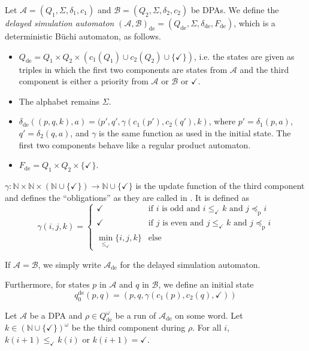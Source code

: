 \begin{defn}
	Let $\mathcal{A} = (Q_1, \Sigma, \delta_1, c_1)$ and $\mathcal{B} = (Q_2, \Sigma, \delta_2, c_2)$ be DPAs. We define the \emph{delayed simulation automaton} $(\mathcal{A},\mathcal{B})_\text{de} = (Q_\text{de}, \Sigma, \delta_\text{de}, F_\text{de})$, which is a deterministic Büchi automaton, as follows.
	
	\begin{itemize}
		\item $Q_\text{de} = Q_1 \times Q_2 \times (c_1(Q_1) \cup c_2(Q_2) \cup \{ \checkmark \})$, i.e. the states are given as triples in which the first two components are states from $\mathcal{A}$ and the third component is either a priority from $\mathcal{A}$ or $\mathcal{B}$ or $\checkmark$.
		\item The alphabet remains $\Sigma$.
		\item $\delta_\text{de}( (p, q, k), a ) = ( p', q', \gamma(c_1(p'), c_2(q'), k)$, where $p' = \delta_1(p, a)$, $q' = \delta_2(q, a)$, and $\gamma$ is the same function as used in the initial state. The first two components behave like a regular product automaton.
		\item $F_\text{de} = Q_1 \times Q_2 \times \{ \checkmark \}$.
	\end{itemize}
	
	$\gamma : \mathbb{N} \times \mathbb{N} \times (\mathbb{N} \cup \{\checkmark\}) \rightarrow \mathbb{N} \cup \{\checkmark\}$ is the update function of the third component and defines the \enquote{obligations} as they are called in \cite{FritzWilke06}. It is defined as 
	$$ \gamma(i, j, k) = \begin{cases}
		\checkmark & \text{if } i \text{ is odd and } i \leq_\checkmark k \text{ and } j \preceq_\text{p} i \\
		\checkmark & \text{if } j \text{ is even and } j \leq_\checkmark k \text{ and } j \preceq_\text{p} i \\
		\min_{\leq_\checkmark} \{ i,j,k \} & \text{else}
	\end{cases} $$
	
	If $\mathcal{A} = \mathcal{B}$, we simply write $\mathcal{A}_\text{de}$ for the delayed simulation automaton.
	
	Furthermore, for states $p$ in $\mathcal{A}$ and $q$ in $\mathcal{B}$, we define an initial state $$q_0^\text{de}(p, q) = (p, q, \gamma(c_1(p), c_2(q), \checkmark))$$
\end{defn}

\begin{lem}
\label{lem:fritzwilke:k_shrink}
	Let $\mathcal{A}$ be a DPA and $\rho \in Q_\text{de}^\omega$ be a run of $\mathcal{A}_\text{de}$ on some word. Let $k \in (\mathbb{N} \cup \{\checkmark\})^\omega$ be the third component during $\rho$. For all $i$, $k(i+1) \leq_\checkmark k(i)$ or $k(i+1) = \checkmark$.
\end{lem}


